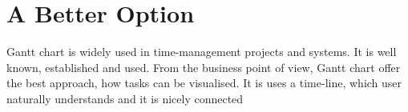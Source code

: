 \section{A Better Option}
Gantt chart is widely used in time-management projects and systems. It is well known, established and used. From the business point of view, Gantt chart offer the best approach, how tasks can be visualised. 
It is uses a time-line, which user naturally understands and it is nicely connected

\subsection{}
\subsection{}

\section{}
\section{}
\section{}



    
    
	
    
